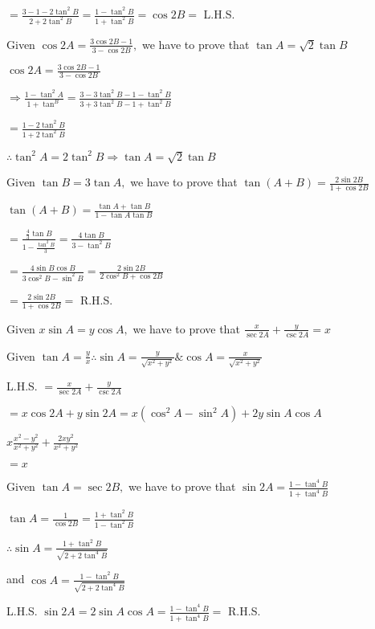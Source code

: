   $= \frac{3 - 1 - 2\tan^2B}{2 + 2\tan^2B} = \frac{1 - \tan^2B}{1 + \tan^2B} = \cos 2B =$ L.H.S.

\item Given $\cos 2A = \frac{3\cos 2B - 1}{3 - \cos 2B},$ we have to prove that $\tan A = \sqrt{2}\tan B$

  $\cos 2A = \frac{3\cos 2B - 1}{3 - \cos 2B}$

  $\Rightarrow \frac{1 - \tan^2A}{1 + \tan^B} = \frac{3 - 3\tan^2B - 1 - \tan^2B}{3 + 3\tan^2B - 1 + \tan^2B}$

  $= \frac{1 - 2\tan^2B}{1 + 2\tan^2B}$

  $\therefore \tan^2A = 2\tan^2B \Rightarrow \tan A = \sqrt{2}\tan B$

\item Given $\tan B = 3\tan A,$ we have to prove that $\tan(A + B) = \frac{2\sin 2B}{1 + \cos 2B}$

  $\tan(A + B) = \frac{\tan A + \tan B}{1 - \tan A\tan B}$

  $= \frac{\frac{4}{3}\tan B}{1 - \frac{\tan^2B}{3}} = \frac{4\tan B}{3 - \tan^2B}$

  $= \frac{4\sin B\cos B}{3\cos^2B - \sin^2B} = \frac{2\sin2B}{2\cos^2B + \cos2B}$

  $= \frac{2\sin2B}{1 + \cos2B} =$ R.H.S.

\item Given $x\sin A = y\cos A,$ we have to prove that $\frac{x}{\sec 2A} + \frac{y}{\csc 2A} = x$

  Given $\tan A = \frac{y}{x} \therefore \sin A = \frac{y}{\sqrt{x^2 + y^2}} \& \cos A = \frac{x}{\sqrt{x^2 + y^2}}$

  L.H.S. $= \frac{x}{\sec 2A} + \frac{y}{\csc 2A}$

  $= x\cos2A + y\sin2A = x(\cos^2A - \sin^2A) + 2y\sin A\cos A$

  $x\frac{x^2 - y^2}{x^2 + y^2} + \frac{2xy^2}{x^2 + y^2}$

  $= x$

\item Given $\tan A = \sec 2B,$ we have to prove that $\sin 2A = \frac{1 - \tan^4B}{1 + \tan^4B}$

  $\tan A = \frac{1}{\cos 2B} = \frac{1 + \tan^2B}{1 - \tan^2B}$

  $\therefore \sin A = \frac{1 + \tan^2B}{\sqrt{2 + 2\tan^4B}}$

  and $\cos A = \frac{1 - \tan^2B}{\sqrt{2 + 2\tan^4B}}$

  L.H.S. $\sin 2A = 2\sin A\cos A = \frac{1 - \tan^4B}{1 + \tan^4B} =$ R.H.S.

